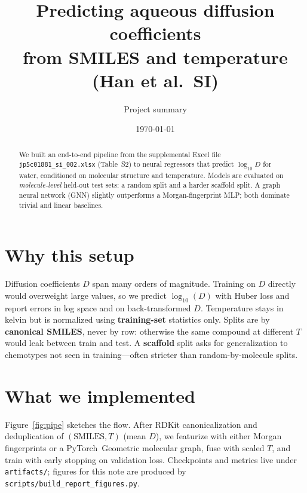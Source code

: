 \documentclass[11pt,a4paper]{article}
\title{\textbf{Predicting aqueous diffusion coefficients}\\{\large from SMILES and temperature (Han et al.\ SI)}}
\author{Project summary}
\date{\today}
\begin{document}
\maketitle

\begin{abstract}
We built an end-to-end pipeline from the supplemental Excel file \texttt{jp5c01881\_si\_002.xlsx} (Table~S2) to neural regressors that predict $\log_{10} D$ for water, conditioned on molecular structure and temperature. Models are evaluated on \emph{molecule-level} held-out test sets: a random split and a harder scaffold split. A graph neural network (GNN) slightly outperforms a Morgan-fingerprint MLP; both dominate trivial and linear baselines.
\end{abstract}

\section*{Why this setup}
Diffusion coefficients $D$ span many orders of magnitude. Training on $D$ directly would overweight large values, so we predict $\log_{10}(D)$ with Huber loss and report errors in log space and on back-transformed $D$. Temperature stays in kelvin but is normalized using \textbf{training-set} statistics only. Splits are by \textbf{canonical SMILES}, never by row: otherwise the same compound at different $T$ would leak between train and test. A \textbf{scaffold} split asks for generalization to chemotypes not seen in training---often stricter than random-by-molecule splits.

\section*{What we implemented}
Figure~\ref{fig:pipe} sketches the flow. After RDKit canonicalization and deduplication of $(\text{SMILES},T)$ (mean $D$), we featurize with either Morgan fingerprints or a PyTorch~Geometric molecular graph, fuse with scaled $T$, and train with early stopping on validation loss. Checkpoints and metrics live under \texttt{artifacts/}; figures for this note are produced by \texttt{scripts/build\_report\_figures.py}.
\end{document}
